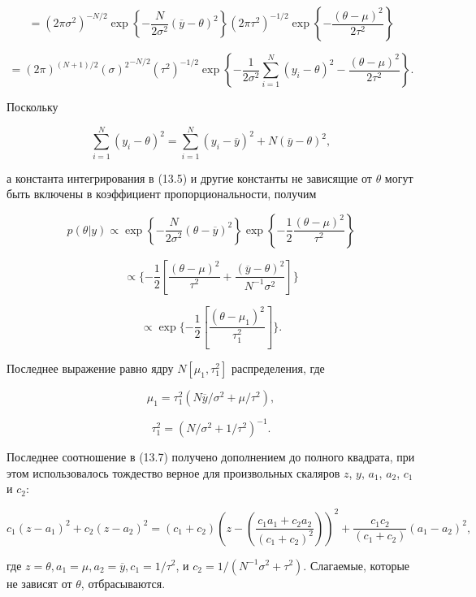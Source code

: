 \[
=(2\pi{\sigma}^{2})^{-N/2}\exp{\left\lbrace-\frac{N}{2{\sigma}^{2}}{(\overline{y}-\theta)}^{2}\right\rbrace}{(2\pi{\tau}^{2})}^{-1/2}\exp\left\lbrace-\dfrac{(\theta-\mu)^{2}}{2\tau^{2}}\right\rbrace
\]

\[
=(2\pi)^{(N+1)/2}{(\sigma)^{2}}^{-N/2}(\tau^{2})^{-1/2}\exp\left\lbrace-\dfrac{1}{2\sigma^{2}}\sum^{N}_{i=1}(y_i-\theta)^{2}-\dfrac{(\theta-\mu)^{2}}{2\tau^{2}}\right\rbrace.
\]

Поскольку 

\[
\sum^{N}_{i=1}(y_i-\theta)^{2}=\sum^{N}_{i=1}(y_i-\overline{y})^{2}+N(\overline{y}-\theta)^{2},
\]

а константа интегрирования в (13.5) и другие константы не зависящие от $\theta$ могут быть включены в коэффициент пропорциональности, получим

\begin{equation}
p(\theta|y)\propto{\exp}\left\lbrace-\dfrac{N}{2\sigma^{2}}(\theta-\overline{y})^{2}\right\rbrace{\exp}\left\lbrace-\dfrac{1}{2}\dfrac{(\theta-\mu)^{2}}{\tau^{2}}\right\rbrace
\end{equation}

\[
\propto\lbrace-\dfrac{1}{2}\left[\dfrac{(\theta-\mu)^{2}}{\tau^{2}}+\dfrac{(\overline{y}-\theta)^{2}}{N^{-1}\sigma^{2}}\right] \rbrace
\]

\begin{equation}
\propto{\exp}\lbrace-\dfrac{1}{2}\left[\dfrac{(\theta-\mu_{1})^{2}}{\tau^{2}_{1}}\right]\rbrace.
\end{equation}

Последнее выражение равно ядру $N[\mu_1,\tau^{2}_1]$ распределения, где 

\begin{equation}
\mu_1=\tau^{2}_{1}(N\overline{y}/\sigma^{2}+\mu/\tau^{2}),
\end{equation}

\[
\tau^{2}_1=(N/\sigma^{2}+1/\tau^{2})^{-1}.
\]

Последнее соотношение в (13.7) получено дополнением до полного квадрата, при этом использовалось тождество верное для произвольных скаляров $z$, $y$, $a_1$, $a_2$, $c_1$ и $c_2$:

\[
c_{1}(z-a_1)^{2}+c_{2}(z-a_2)^{2}=(c_1+c_2)\left(z-\left( \dfrac{c_{1}a_1+c_{2}a_2}{(c_1+c_2)^{2}}\right)\right)^{2}+\dfrac{c_{1}c_{2}}{(c_1+c_2)}(a_{1}-a_2)^{2}, 
\]

где $z=\theta, a_1=\mu, a_2=\overline{y}, c_1=1/\tau^2$, и $c_2=1/(N^{-1}\sigma^{2}+\tau^{2})$. Слагаемые, которые не зависят от $\theta$, отбрасываются.

